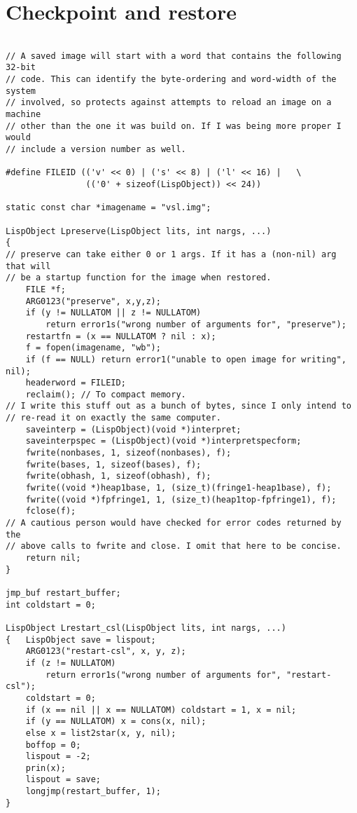 
\chapter{Checkpoint and restore}




{\small\begin{verbatim}

// A saved image will start with a word that contains the following 32-bit
// code. This can identify the byte-ordering and word-width of the system
// involved, so protects against attempts to reload an image on a machine
// other than the one it was build on. If I was being more proper I would
// include a version number as well.

#define FILEID (('v' << 0) | ('s' << 8) | ('l' << 16) |   \
                (('0' + sizeof(LispObject)) << 24))

static const char *imagename = "vsl.img";

LispObject Lpreserve(LispObject lits, int nargs, ...)
{
// preserve can take either 0 or 1 args. If it has a (non-nil) arg that will
// be a startup function for the image when restored.
    FILE *f;
    ARG0123("preserve", x,y,z);
    if (y != NULLATOM || z != NULLATOM)
        return error1s("wrong number of arguments for", "preserve");
    restartfn = (x == NULLATOM ? nil : x);
    f = fopen(imagename, "wb");
    if (f == NULL) return error1("unable to open image for writing", nil);
    headerword = FILEID;
    reclaim(); // To compact memory.
// I write this stuff out as a bunch of bytes, since I only intend to
// re-read it on exactly the same computer.
    saveinterp = (LispObject)(void *)interpret;
    saveinterpspec = (LispObject)(void *)interpretspecform;
    fwrite(nonbases, 1, sizeof(nonbases), f);
    fwrite(bases, 1, sizeof(bases), f);
    fwrite(obhash, 1, sizeof(obhash), f);
    fwrite((void *)heap1base, 1, (size_t)(fringe1-heap1base), f);
    fwrite((void *)fpfringe1, 1, (size_t)(heap1top-fpfringe1), f);
    fclose(f);
// A cautious person would have checked for error codes returned by the
// above calls to fwrite and close. I omit that here to be concise.
    return nil;
}

jmp_buf restart_buffer;
int coldstart = 0;

LispObject Lrestart_csl(LispObject lits, int nargs, ...)
{   LispObject save = lispout;
    ARG0123("restart-csl", x, y, z);
    if (z != NULLATOM)
        return error1s("wrong number of arguments for", "restart-csl");
    coldstart = 0;
    if (x == nil || x == NULLATOM) coldstart = 1, x = nil;
    if (y == NULLATOM) x = cons(x, nil);
    else x = list2star(x, y, nil);
    boffop = 0;
    lispout = -2;
    prin(x);
    lispout = save;
    longjmp(restart_buffer, 1);
}



\end{verbatim}}
